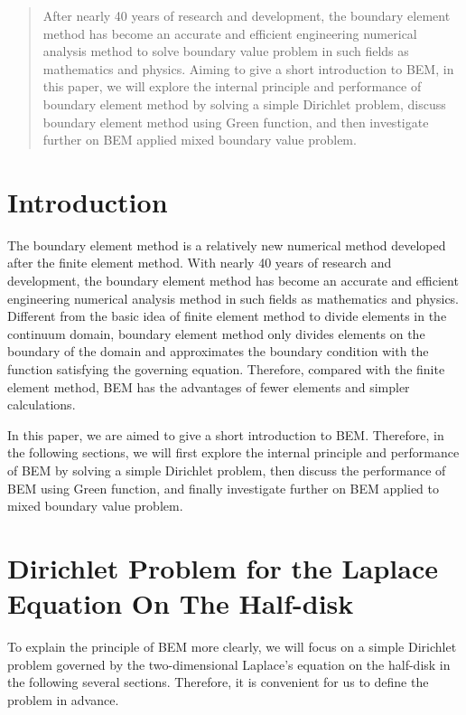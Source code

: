 \documentclass[a4paper,12pt]{article}
\begin{document}
\begin{abstract}
After nearly 40 years of research and development, the boundary element method has become an accurate and efficient engineering numerical analysis method to solve boundary value problem in such fields as mathematics and physics. Aiming to give a short introduction to BEM, in this paper, we will explore the internal principle and performance of boundary element method by solving a simple Dirichlet problem, discuss boundary element method using Green function, and then investigate further on BEM applied mixed boundary value problem.
\end{abstract}

\tableofcontents

\newpage

\section{Introduction}
The boundary element method is a relatively new numerical method developed after the finite element method. With nearly 40 years of research and development, the boundary element method has become an accurate and efficient engineering numerical analysis method in such fields as mathematics and physics. Different from the basic idea of finite element method to divide elements in the continuum domain, boundary element method only divides elements on the boundary of the domain and approximates the boundary condition with the function satisfying the governing equation. Therefore, compared with the finite element method, BEM has the advantages of fewer elements and simpler calculations. 

\par In this paper, we are aimed to give a short introduction to BEM. Therefore, in the following sections, we will first explore the internal principle and performance of BEM by solving a simple Dirichlet problem, then discuss the performance of BEM using Green function, and finally investigate further on BEM applied to mixed boundary value problem. 

\section{Dirichlet Problem for the Laplace Equation On The Half-disk}
To explain the principle of BEM  more clearly, we will focus on a simple Dirichlet problem governed by the two-dimensional Laplace's equation on the half-disk in the following several sections. Therefore, it is convenient for us to define the problem in advance.
\end{document}
